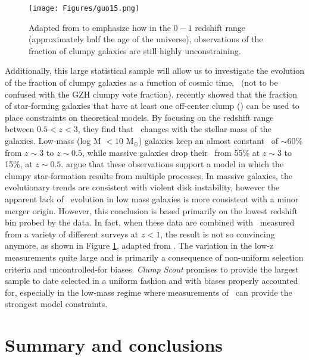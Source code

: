 \begin{figure}
\centering
\texttt{[image: Figures/guo15.png]}
\caption{Adapted from \cite{Guo2015} to emphasize how in the $0 - 1$ redshift range (approximately half the age of the universe), observations of the fraction of clumpy galaxies are still highly unconstraining.}
\label{fig: clumpy fraction}
\end{figure}


Additionally, this large statistical sample will allow us to investigate the evolution of the fraction of clumpy galaxies as a function of cosmic time, \fclump~(not to be confused with the GZH clumpy vote fraction). \cite{Guo2015} recently showed that the fraction of star-forming galaxies that have at least one off-center clump (\fclump) can be used to place constraints on theoretical models. By focusing on the redshift range between $0.5 <z<3$, they find that \fclump~changes with the stellar mass of the galaxies. Low-mass (log M $<10$ M$_{\odot}$) galaxies keep an almost constant \fclump~of $\sim$60\% from $z\sim3$ to $z\sim0.5$, while massive galaxies drop their \fclump~from 55\% at $z\sim3$ to 15\%, at $z\sim0.5$. \cite{Guo2015} argue that these observations support a model in which the clumpy star-formation results from multiple processes. In massive galaxies, the evolutionary trends are consistent with violent disk instability, however the apparent lack of \fclump~evolution in low mass galaxies is more consistent with a minor merger origin. However, this conclusion is based primarily on the lowest redshift bin probed by the \cite{Guo2015} data. In fact, when these data are combined with \fclump~measured from a variety of different surveys at $z<1$, the result is not so convincing anymore, as shown in Figure \ref{fig: clumpy fraction}, adapted from \cite{Guo2015}. The variation in the low-z measurements quite large and is primarily a consequence of non-uniform selection criteria and uncontrolled-for biases. \textit{Clump Scout} promises to provide the largest sample to date selected in a uniform fashion and with biases properly accounted for, especially in the low-mass regime where measurements of \fclump~can provide the strongest model constraints.



\section{Summary and conclusions}\label{chap5: summary}

